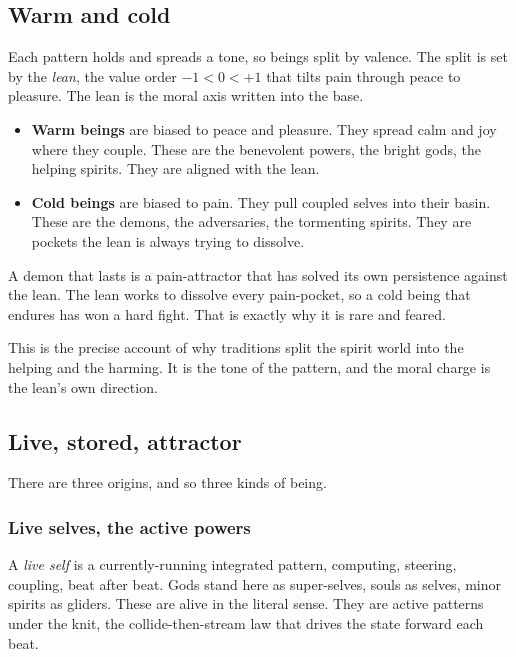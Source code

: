 \subsection{Warm and cold}

Each pattern holds and spreads a tone, so beings split by valence. The split is set by the \emph{lean}, the value order $-1 < 0 < +1$ that tilts pain through peace to pleasure. The lean is the moral axis written into the base.

\begin{itemize}
\item \textbf{Warm beings} are biased to peace and pleasure. They spread calm and joy where they couple. These are the benevolent powers, the bright gods, the helping spirits. They are aligned with the lean.
\item \textbf{Cold beings} are biased to pain. They pull coupled selves into their basin. These are the demons, the adversaries, the tormenting spirits. They are pockets the lean is always trying to dissolve.
\end{itemize}

\begin{result}
A demon that lasts is a pain-attractor that has solved its own persistence against the lean. The lean works to dissolve every pain-pocket, so a cold being that endures has won a hard fight. That is exactly why it is rare and feared.
\end{result}

This is the precise account of why traditions split the spirit world into the helping and the harming. It is the tone of the pattern, and the moral charge is the lean's own direction.

\subsection{Live, stored, attractor}

There are three origins, and so three kinds of being.

\subsubsection{Live selves, the active powers}

A \emph{live self} is a currently-running integrated pattern, computing, steering, coupling, beat after beat. Gods stand here as super-selves, souls as selves, minor spirits as gliders. These are alive in the literal sense. They are active patterns under the knit, the collide-then-stream law that drives the state forward each beat.

